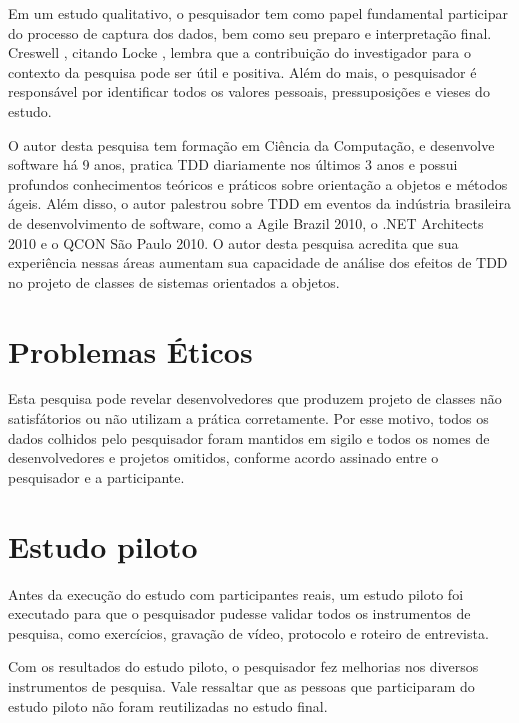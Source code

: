 Em um estudo qualitativo, o pesquisador tem como papel fundamental participar do 
processo de captura dos dados, bem como seu preparo e interpretação final.
Creswell \cite{creswell}, citando Locke \cite{locke}, lembra
que a contribuição do investigador para o contexto da pesquisa pode ser útil e
positiva. Além do mais, o pesquisador é responsável por
identificar todos os valores pessoais, pressuposições e vieses do estudo.

O autor desta pesquisa tem formação em Ciência da Computação, e desenvolve software há 9
anos, pratica TDD diariamente nos últimos 3 anos e possui profundos
conhecimentos teóricos e práticos sobre orientação a objetos e métodos ágeis.
Além disso, o autor palestrou sobre TDD em eventos da indústria brasileira
de desenvolvimento de software, como a Agile Brazil 2010, o .NET Architects
2010 e o QCON São Paulo 2010. O autor desta pesquisa acredita que sua experiência nessas
áreas aumentam sua capacidade de análise dos efeitos de TDD no projeto de classes de sistemas 
orientados a objetos.

\section{Problemas Éticos}
\label{sec:planejamento-etica}

Esta pesquisa pode revelar desenvolvedores que produzem projeto de classes não
satisfátorios ou não utilizam a prática corretamente.
Por esse motivo, todos os dados colhidos pelo pesquisador foram mantidos em
sigilo e todos os nomes de desenvolvedores e projetos omitidos, conforme acordo 
assinado entre o pesquisador e a participante.

\section{Estudo piloto}
\label{sec:estudo-piloto}

Antes da execução do estudo com participantes reais, um estudo piloto foi
executado para que o pesquisador pudesse validar todos os instrumentos de pesquisa,
como exercícios, gravação de vídeo, protocolo e roteiro de entrevista.

Com os resultados do estudo piloto, o pesquisador fez melhorias
nos diversos instrumentos de pesquisa.
Vale ressaltar que as pessoas que participaram do estudo piloto não foram reutilizadas no
estudo final.

